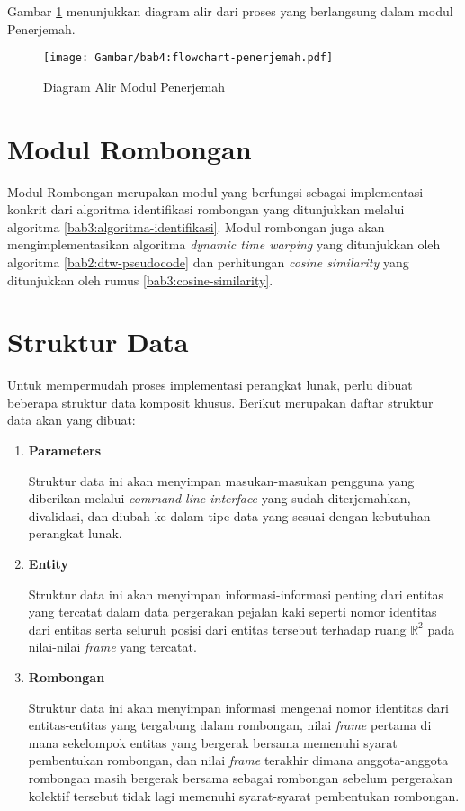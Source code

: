 Gambar \ref{bab4:flowchart-penerjemah} menunjukkan diagram alir dari proses yang berlangsung dalam modul Penerjemah.

\begin{figure}[h]
    \centering
    \texttt{[image: Gambar/bab4:flowchart-penerjemah.pdf]}
    \caption{Diagram Alir Modul Penerjemah}
    \label{bab4:flowchart-penerjemah}
\end{figure}

\section{Modul Rombongan}
\label{sec:rombongan-identifier}

Modul Rombongan merupakan modul yang berfungsi sebagai implementasi konkrit dari algoritma identifikasi rombongan yang ditunjukkan melalui algoritma \ref{bab3:algoritma-identifikasi}. Modul rombongan juga akan mengimplementasikan algoritma \textit{dynamic time warping} yang ditunjukkan oleh algoritma \ref{bab2:dtw-pseudocode} dan perhitungan \textit{cosine similarity} yang ditunjukkan oleh rumus \ref{bab3:cosine-similarity}.

\section{Struktur Data}
\label{sec:data-structure}

Untuk mempermudah proses implementasi perangkat lunak, perlu dibuat beberapa struktur data komposit khusus. Berikut merupakan daftar struktur data akan yang dibuat:

\begin{enumerate}
    \item \textbf{Parameters}
    
    Struktur data ini akan menyimpan masukan-masukan pengguna yang diberikan melalui \textit{command line interface} yang sudah diterjemahkan, divalidasi, dan diubah ke dalam tipe data yang sesuai dengan kebutuhan perangkat lunak.
    
    \item \textbf{Entity}
    
    Struktur data ini akan menyimpan informasi-informasi penting dari entitas yang tercatat dalam data pergerakan pejalan kaki seperti nomor identitas dari entitas serta seluruh posisi dari entitas tersebut terhadap ruang $\mathbb{R}^2$ pada nilai-nilai \textit{frame} yang tercatat.
    
    \item \textbf{Rombongan}
    
    Struktur data ini akan menyimpan informasi mengenai nomor identitas dari entitas-entitas yang tergabung dalam rombongan, nilai \textit{frame} pertama di mana sekelompok entitas yang bergerak bersama memenuhi syarat pembentukan rombongan, dan nilai \textit{frame} terakhir dimana anggota-anggota rombongan masih bergerak bersama sebagai rombongan sebelum pergerakan kolektif tersebut tidak lagi memenuhi syarat-syarat pembentukan rombongan.
\end{enumerate}
